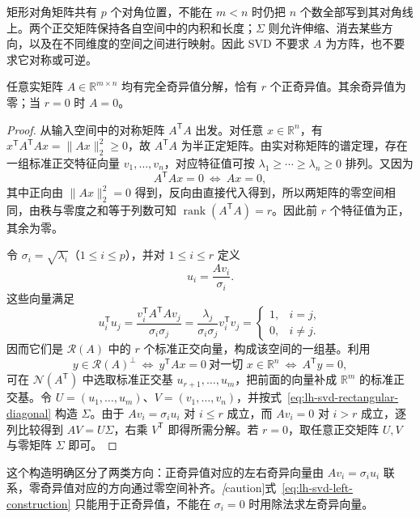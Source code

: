 矩形对角矩阵共有 $p$ 个对角位置，不能在 $m<n$ 时仍把 $n$ 个数全部写到其对角线上。两个正交矩阵保持各自空间中的内积和长度；$\Sigma$ 则允许伸缩、消去某些方向，以及在不同维度的空间之间进行映射。因此 SVD 不要求 $A$ 为方阵，也不要求它对称或可逆。

\begin{theorem}[奇异值分解的存在性]
\label{thm:lh-svd-existence}
任意实矩阵 $A\in\mathbb R^{m\times n}$ 均有完全奇异值分解，恰有 $r$ 个正奇异值。其余奇异值为零；当 $r=0$ 时 $A=0$。
\end{theorem}
\begin{proof}
从输入空间中的对称矩阵 $A^{\mathsf T}A$ 出发。对任意 $x\in\mathbb R^n$，有 $x^{\mathsf T}A^{\mathsf T}Ax=\|Ax\|_2^2\geq0$，故 $A^{\mathsf T}A$ 为半正定矩阵。由实对称矩阵的谱定理，存在一组标准正交特征向量 $v_1,\ldots,v_n$，对应特征值可按 $\lambda_1\geq\cdots\geq\lambda_n\geq0$ 排列。又因为
\[
A^{\mathsf T}Ax=0\ \Longleftrightarrow\ Ax=0,
\]
其中正向由 $\|Ax\|_2^2=0$ 得到，反向由直接代入得到，所以两矩阵的零空间相同，由秩与零度之和等于列数可知 $\operatorname{rank}(A^{\mathsf T}A)=r$。因此前 $r$ 个特征值为正，其余为零。

令 $\sigma_i=\sqrt{\lambda_i}$（$1\leq i\leq p$），并对 $1\leq i\leq r$ 定义
\begin{equation}
u_i=\frac{Av_i}{\sigma_i}.
\label{eq:lh-svd-left-construction}
\end{equation}
这些向量满足
\[
u_i^{\mathsf T}u_j
=\frac{v_i^{\mathsf T}A^{\mathsf T}Av_j}{\sigma_i\sigma_j}
=\frac{\lambda_j}{\sigma_i\sigma_j}v_i^{\mathsf T}v_j
=\begin{cases}1,&i=j,\\0,&i\ne j.\end{cases}
\]
因而它们是 $\mathcal R(A)$ 中的 $r$ 个标准正交向量，构成该空间的一组基。利用
\[
y\in\mathcal R(A)^\perp
\ \Longleftrightarrow\ y^{\mathsf T}Ax=0\ \text{对一切 }x\in\mathbb R^n
\ \Longleftrightarrow\ A^{\mathsf T}y=0,
\]
可在 $\mathcal N(A^{\mathsf T})$ 中选取标准正交基 $u_{r+1},\ldots,u_m$，把前面的向量补成 $\mathbb R^m$ 的标准正交基。令 $U=(u_1,\ldots,u_m)$、$V=(v_1,\ldots,v_n)$，并按式~\eqref{eq:lh-svd-rectangular-diagonal} 构造 $\Sigma$。由于 $Av_i=\sigma_i u_i$ 对 $i\leq r$ 成立，而 $Av_i=0$ 对 $i>r$ 成立，逐列比较得到 $AV=U\Sigma$，右乘 $V^{\mathsf T}$ 即得所需分解。若 $r=0$，取任意正交矩阵 $U,V$ 与零矩阵 $\Sigma$ 即可。
\end{proof}

这个构造明确区分了两类方向：正奇异值对应的左右奇异向量由 $Av_i=\sigma_i u_i$ 联系，零奇异值对应的方向通过零空间补齐。\emph[caution]{式~\eqref{eq:lh-svd-left-construction} 只能用于正奇异值}，不能在 $\sigma_i=0$ 时用除法求左奇异向量。

